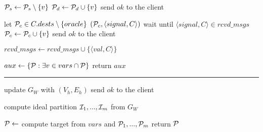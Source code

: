 \begin{algorithm}[t!]
\begin{distribalgo}[1]
                \STATE $\mathcal{P}_s \leftarrow \mathcal{P}_s \setminus \{v\}$
                \STATE $\mathcal{P}_d \leftarrow \mathcal{P}_d \cup      \{v\}$
                \STATE send $ok$ to the client
	\ENDINDENT

        \vspace{1.0mm}
    
		\STATE let $\mathcal{P}_c \in C.dests \setminus \{oracle\}$
		\STATE \rmcast$(\mathcal{P}_c, \langle signal, C \rangle )$
		\STATE wait until $\langle signal, C \rangle \in rcvd\_msgs$
		\STATE $\mathcal{P}_c \leftarrow \mathcal{P}_c \cup      \{v\}$
                \STATE send $ok$ to the client
	\ENDINDENT

	\vspace{1.0mm}
		\STATE $rcvd\_msgs \leftarrow rcvd\_msgs \cup \{\langle val, C \rangle\}$
	\ENDINDENT
	
	\vspace{1.0mm}
		\STATE $aux \leftarrow \{ \mathcal{P} : \exists v \in vars \cap \mathcal{P} \}$
		\STATE return $aux$
	\ENDINDENT
	
	\rule{83mm}{0.4pt}

		\STATE update $G_W$ with $(V_h,E_h)$
		\STATE send $ok$ to the client
	\ENDINDENT
	
	\vspace{1.0mm}
    
		\STATE compute ideal partition $\mathcal{I}_1, ..., \mathcal{I}_m$ from $G_W$
	\ENDINDENT
	
	\vspace{1.0mm}
    
		\STATE $\mathcal{P} \leftarrow$ compute target from $vars$ and $\mathcal{P}_1, ..., \mathcal{P}_m$
		\STATE return $\mathcal{P}$
	\ENDINDENT	
	

\end{distribalgo}
\end{algorithm}
